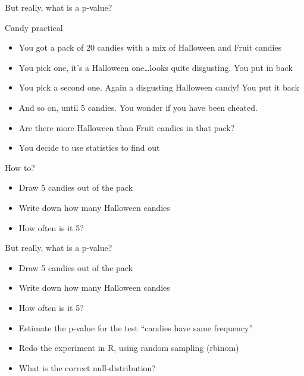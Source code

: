 \documentclass{beamer}
\begin{document}
\begin{frame}{But really, what is a p-value?}

 \begin{block}{Candy practical}
 \begin{itemize}[<+->]
  \item You got a pack of 20 candies with a mix of Halloween and Fruit candies
  \item You pick one, it's a Halloween one\dots looks quite disgusting. You put in back
  \item You pick a second one. Again a disgusting Halloween candy! You put it back
  \item And so on, until 5 candies. You wonder if you have been cheated.
  \item Are there more Halloween than Fruit candies in that pack?
  \item You decide to use statistics to find out
 \end{itemize}
 \end{block}


 \begin{exampleblock}{How to?}
  \begin{itemize}[<+->]
   \item Draw 5 candies out of the pack
   \item Write down how many Halloween candies
   \item How often is it 5?
  \end{itemize}
 \end{exampleblock}
  
\end{frame}

\begin{frame}{But really, what is a p-value?}

 \begin{exampleblock}{}
  \begin{itemize}
   \item Draw 5 candies out of the pack
   \item Write down how many Halloween candies
   \item How often is it 5?
   \pause
   \item Estimate the p-value for the test ``candies have same frequency''
   \pause
   \item Redo the experiment in R, using random sampling (rbinom)
   \pause
   \item What is the correct null-distribution?
  \end{itemize}
 \end{exampleblock}
  
\end{frame}
\end{document}
